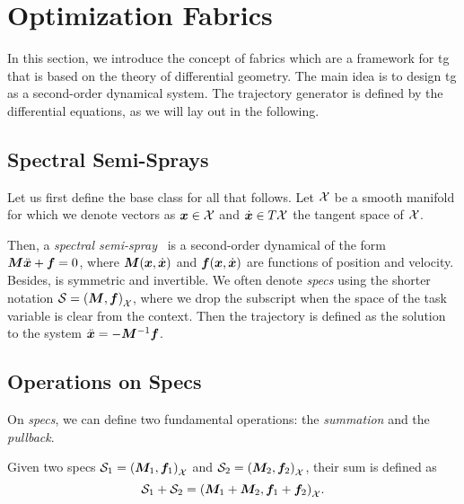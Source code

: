 

\section{Optimization Fabrics} %
\label{sec:optimization_fabrics}

In this section, we introduce the concept of \acf{fabrics}
which are a framework for \ac{tg}
that is based on the theory of differential
geometry. The main idea is to design \ac{tg} as a
second-order dynamical system. The trajectory generator is
defined by the differential equations, as we will lay out in
the following.

\subsection{Spectral Semi-Sprays} %
\label{sub:spectral_semi_sprays}

Let us first define the base class for all that follows.
Let $\mathcal{X}$ be a smooth manifold for which we denote vectors as 
$\bm{x}\in\mathcal{X}$ and $\dot{\bm{x}}\in T\mathcal{X}$ the tangent space of $\mathcal{X}$.

Then, a \textit{spectral semi-spray}~\cite{Ratliff2020} is a
second-order dynamical of the form $\bm{M}\ddot{\bm{x}} + \bm{f} = 0$,
where $\bm{M}(\bm{x},\dot{\bm{x}})$ and $\bm{f}(\bm{x},\dot{\bm{x}})$ are functions of
position and velocity. Besides, \M{} is symmetric and
invertible. We often denote \textit{specs} using the shorter
notation $\mathcal{S} = \left(\bm{M},\bm{f}\right)_{\mathcal{X}}$, where we drop the subscript when
the space of the task variable is clear from the context.
Then the trajectory is defined as the solution to the system
$\ddot{\bm{x}}=-\bm{M}^{-1}\bm{f}$.


\subsection{Operations on Specs} %
\label{sub:operations_on_specs}

On \textit{specs}, we can define two fundamental operations:
the \textit{summation} and the \textit{pullback}.

Given two specs $\mathcal{S}_1 = {\left(\bm{M}_1,\bm{f}_1\right)}_{\mathcal{X}}$ and
$\mathcal{S}_2 = {\left(\bm{M}_2,\bm{f}_2\right)}_{\mathcal{X}}$, their sum is
defined as
\begin{equation}
  \mathcal{S}_1 + \mathcal{S}_2 = {\left(\bm{M}_1 + \bm{M}_2, \bm{f}_1 + \bm{f}_2\right)}_{\mathcal{X}}.
  \label{eq:summation}
\end{equation}

